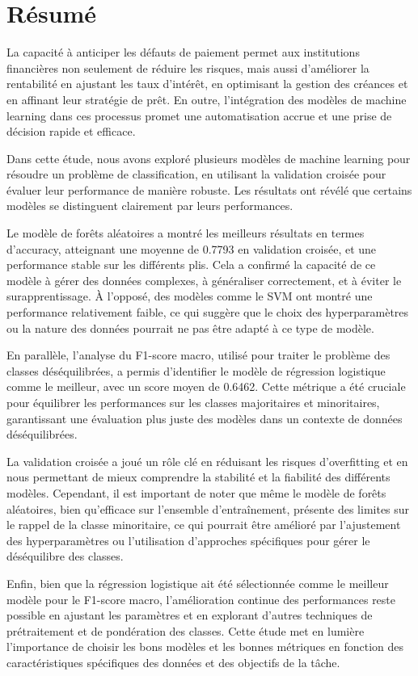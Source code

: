 \section*{Résumé}
La capacité à anticiper les défauts de paiement permet aux institutions financières non seulement de réduire les risques, mais aussi d'améliorer la rentabilité en ajustant les taux d'intérêt, en optimisant la gestion des créances et en affinant leur stratégie de prêt. En outre, l'intégration des modèles de machine learning dans ces processus promet une automatisation accrue et une prise de décision rapide et efficace.

Dans cette étude, nous avons exploré plusieurs modèles de machine learning pour résoudre un problème de classification, en utilisant la validation croisée pour évaluer leur performance de manière robuste. Les résultats ont révélé que certains modèles se distinguent clairement par leurs performances.

Le modèle de forêts aléatoires a montré les meilleurs résultats en termes d'accuracy, atteignant une moyenne de 0.7793 en validation croisée, et une performance stable sur les différents plis. Cela a confirmé la capacité de ce modèle à gérer des données complexes, à généraliser correctement, et à éviter le surapprentissage. À l'opposé, des modèles comme le SVM ont montré une performance relativement faible, ce qui suggère que le choix des hyperparamètres ou la nature des données pourrait ne pas être adapté à ce type de modèle.

En parallèle, l'analyse du F1-score macro, utilisé pour traiter le problème des classes déséquilibrées, a permis d'identifier le modèle de régression logistique comme le meilleur, avec un score moyen de 0.6462. Cette métrique a été cruciale pour équilibrer les performances sur les classes majoritaires et minoritaires, garantissant une évaluation plus juste des modèles dans un contexte de données déséquilibrées.

La validation croisée a joué un rôle clé en réduisant les risques d'overfitting et en nous permettant de mieux comprendre la stabilité et la fiabilité des différents modèles. Cependant, il est important de noter que même le modèle de forêts aléatoires, bien qu'efficace sur l'ensemble d'entraînement, présente des limites sur le rappel de la classe minoritaire, ce qui pourrait être amélioré par l'ajustement des hyperparamètres ou l'utilisation d'approches spécifiques pour gérer le déséquilibre des classes.

Enfin, bien que la régression logistique ait été sélectionnée comme le meilleur modèle pour le F1-score macro, l'amélioration continue des performances reste possible en ajustant les paramètres et en explorant d'autres techniques de prétraitement et de pondération des classes. Cette étude met en lumière l'importance de choisir les bons modèles et les bonnes métriques en fonction des caractéristiques spécifiques des données et des objectifs de la tâche.


\newpage